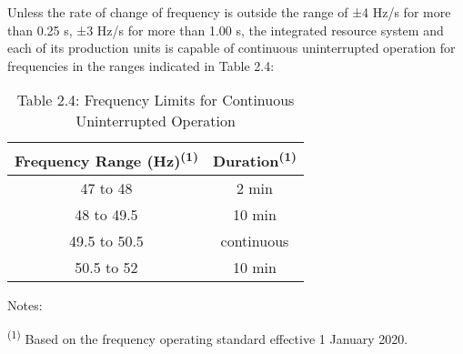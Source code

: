 	Unless the rate of change of frequency is outside the range of ±4 Hz/s for more than 0.25 s, ±3 Hz/s for more than 1.00 s, the integrated resource system and each of its production units is capable of continuous uninterrupted operation for frequencies in the ranges indicated in Table 2.4:
	

	\begin{table}[H]
		\centering
		\begin{tabular}{|c|c|}
			\hline
			\textbf{Frequency Range (Hz)\textsuperscript{(1)}} & \textbf{Duration\textsuperscript{(1)}} \\ \hline
			47 to 48 & 2 min \\ \hline			
			48 to 49.5 & 10 min \\ \hline			
			49.5 to 50.5 & continuous \\ \hline
			50.5 to 52 & 10 min \\ \hline
		\end{tabular}
		\caption*{Table 2.4:  Frequency Limits for Continuous Uninterrupted Operation}
	\end{table}
	Notes:  
	
	\textsuperscript{(1)} Based on the frequency operating standard effective 1 January 2020.
	

	